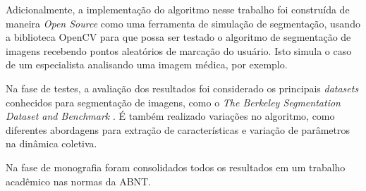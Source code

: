 Adicionalmente, a implementação do algoritmo nesse trabalho foi
construída de maneira \textit{Open Source} como uma ferramenta de
simulação de segmentação, usando a biblioteca \gls{OpenCV} para que possa
ser testado o algoritmo de segmentação de imagens recebendo pontos
aleatórios de marcação do usuário. Isto simula o caso de um
especialista analisando uma imagem médica, por exemplo.

Na fase de testes, a avaliação dos resultados foi considerado os
principais \textit{datasets} conhecidos para segmentação de imagens,
como o \textit{The Berkeley Segmentation Dataset and Benchmark}
\cite{MartinFTM01}. É também realizado variações no algoritmo, como
diferentes abordagens para extração de características e variação de
parâmetros na dinâmica coletiva.

Na fase de monografia foram consolidados todos os resultados em um
trabalho acadêmico nas normas da \gls{ABNT}.
